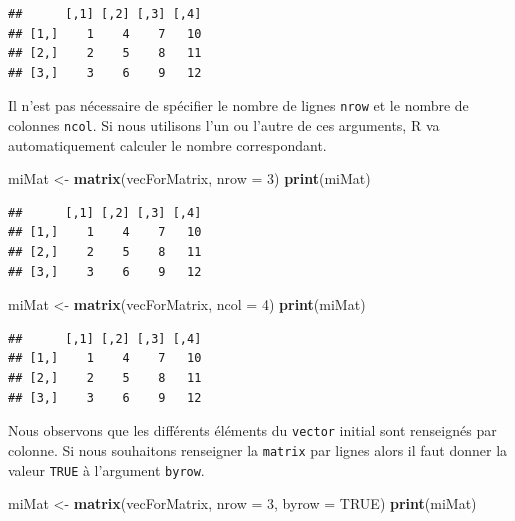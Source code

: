 \documentclass[]{book}
\newenvironment{Shaded}{\begin{snugshade}}{\end{snugshade}}
\newcommand{\KeywordTok}[1]{\textcolor[rgb]{0.13,0.29,0.53}{\textbf{#1}}}
\newcommand{\DataTypeTok}[1]{\textcolor[rgb]{0.13,0.29,0.53}{#1}}
\newcommand{\DecValTok}[1]{\textcolor[rgb]{0.00,0.00,0.81}{#1}}
\newcommand{\StringTok}[1]{\textcolor[rgb]{0.31,0.60,0.02}{#1}}
\newcommand{\OtherTok}[1]{\textcolor[rgb]{0.56,0.35,0.01}{#1}}
\newcommand{\NormalTok}[1]{#1}
\begin{document}
\begin{verbatim}
##      [,1] [,2] [,3] [,4]
## [1,]    1    4    7   10
## [2,]    2    5    8   11
## [3,]    3    6    9   12
\end{verbatim}

Il n'est pas nécessaire de spécifier le nombre de lignes \texttt{nrow}
et le nombre de colonnes \texttt{ncol}. Si nous utilisons l'un ou
l'autre de ces arguments, R va automatiquement calculer le nombre
correspondant.

\begin{Shaded}
\begin{Highlighting}[]
\NormalTok{miMat <-}\StringTok{ }\KeywordTok{matrix}\NormalTok{(vecForMatrix, }\DataTypeTok{nrow =} \DecValTok{3}\NormalTok{)}
\KeywordTok{print}\NormalTok{(miMat)}
\end{Highlighting}
\end{Shaded}

\begin{verbatim}
##      [,1] [,2] [,3] [,4]
## [1,]    1    4    7   10
## [2,]    2    5    8   11
## [3,]    3    6    9   12
\end{verbatim}

\begin{Shaded}
\begin{Highlighting}[]
\NormalTok{miMat <-}\StringTok{ }\KeywordTok{matrix}\NormalTok{(vecForMatrix, }\DataTypeTok{ncol =} \DecValTok{4}\NormalTok{)}
\KeywordTok{print}\NormalTok{(miMat)}
\end{Highlighting}
\end{Shaded}

\begin{verbatim}
##      [,1] [,2] [,3] [,4]
## [1,]    1    4    7   10
## [2,]    2    5    8   11
## [3,]    3    6    9   12
\end{verbatim}

Nous observons que les différents éléments du \texttt{vector} initial
sont renseignés par colonne. Si nous souhaitons renseigner la
\texttt{matrix} par lignes alors il faut donner la valeur \texttt{TRUE}
à l'argument \texttt{byrow}.

\begin{Shaded}
\begin{Highlighting}[]
\NormalTok{miMat <-}\StringTok{ }\KeywordTok{matrix}\NormalTok{(vecForMatrix, }\DataTypeTok{nrow =} \DecValTok{3}\NormalTok{, }\DataTypeTok{byrow =} \OtherTok{TRUE}\NormalTok{)}
\KeywordTok{print}\NormalTok{(miMat)}
\end{Highlighting}
\end{Shaded}
\end{document}

